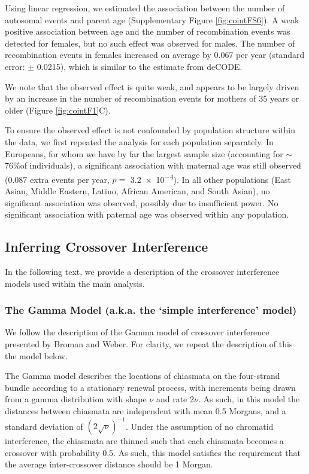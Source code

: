 Using linear regression, we estimated the association between the number
of autosomal events and parent age (Supplementary Figure \ref{fig:cointFS6}). 
A weak positive association between age and the number of recombination events was
detected for females, but no such effect was observed for males. The number of
recombination events in females increased on average by 0.067 per year (standard
error: $\pm$ 0.0215), which is similar to the estimate from deCODE.  

We note that the observed effect is quite weak, and appears to be largely
driven by an increase in the number of recombination events for mothers of 35
years or older (Figure \ref{fig:cointF1}C).  

To ensure the observed effect is not confounded by population
structure within the data, we first repeated the analysis for each population
separately. In Europeans, for whom we have by far the largest sample size
(accounting for $\sim$76\%of individuals), a significant association with maternal
age was still observed (0.087 extra events per year, $p=$ \num{3.2e-4}). In all
other populations (East Asian, Middle Eastern, Latino, African American, and
South Asian), no significant association was observed, possibly due to
insufficient power. No significant association with paternal age was observed
within any population.  

\subsection{Inferring Crossover Interference}
In the following text, we provide a description of the crossover interference
models used within the main analysis.  

\subsubsection{The Gamma Model (a.k.a. the `simple interference' model)} %

We follow the description of the Gamma model of crossover interference  
presented by Broman and Weber\cite{Broman2000}. For clarity, we repeat the description of this the  
model below.  

The Gamma model describes the locations of chiasmata on the four-strand  
bundle according to a stationary renewal process, with increments being drawn  
from a gamma distribution with shape $\nu$ and rate 2$\nu$. As such, in this model the  
distances between chiasmata are independent with mean 0.5 Morgans, and a  
standard deviation of $(2 \sqrt{\nu})^{-1}$. Under the assumption of no chromatid interference,  
the chiasmata are thinned such that each chiasmata becomes a crossover with  
probability 0.5. As such, this model satisfies the requirement that the average 
inter-crossover distance should be 1 Morgan.   

